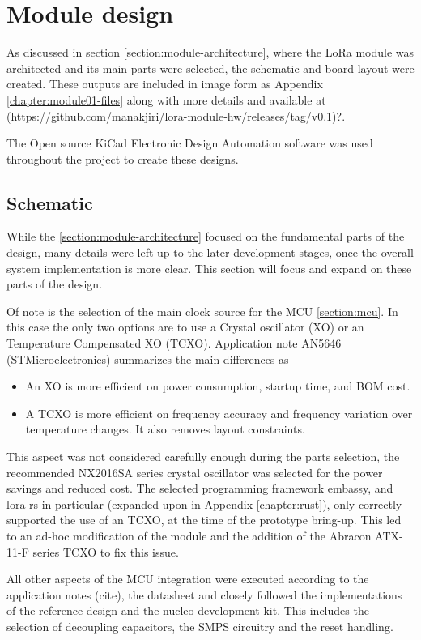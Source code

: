 
\section{Module design}
As discussed in section \ref{section:module-architecture}, where the LoRa module was architected and its main parts were selected, the schematic and board layout were created. These outputs are included in image form as Appendix \ref{chapter:module01-files} along with more details and available at (https://github.com/manakjiri/lora-module-hw/releases/tag/v0.1)?.

The Open source KiCad Electronic Design Automation software was used throughout the project to create these designs. 

\subsection{Schematic}
While the \ref{section:module-architecture} focused on the fundamental parts of the design, many details were left up to the later development stages, once the overall system implementation is more clear. This section will focus and expand on these parts of the design.

Of note is the selection of the main clock source for the MCU \ref{section:mcu}. In this case the only two options are to use a Crystal oscillator (XO) or an Temperature Compensated XO (TCXO). Application note AN5646 (STMicroelectronics) summarizes the main differences as
\begin{itemize}
    \item An XO is more efficient on power consumption, startup time, and BOM cost.
    \item A TCXO is more efficient on frequency accuracy and frequency variation over temperature changes. It also
    removes layout constraints.
\end{itemize}

This aspect was not considered carefully enough during the parts selection, the recommended NX2016SA series crystal oscillator was selected for the power savings and reduced cost. The selected programming framework embassy, and lora-rs in particular (expanded upon in Appendix \ref{chapter:rust}), only correctly supported the use of an TCXO, at the time of the prototype bring-up. This led to an ad-hoc modification of the module and the addition of the Abracon ATX-11-F series TCXO to fix this issue.

All other aspects of the MCU integration were executed according to the application notes (cite), the datasheet and closely followed the implementations of the reference design and the nucleo development kit. This includes the selection of decoupling capacitors, the SMPS circuitry and the reset handling.

